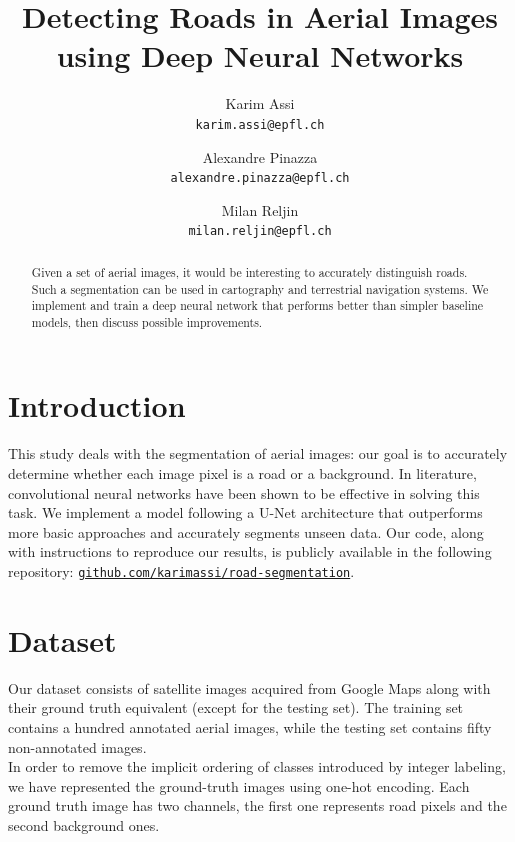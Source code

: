 \documentclass[10pt,conference,compsocconf]{IEEEtran}
\begin{document}
\title{Detecting Roads in Aerial Images using Deep Neural Networks}
\author{
  Karim Assi\\
  \texttt{karim.assi@epfl.ch}
  \and
  Alexandre Pinazza\\
  \texttt{alexandre.pinazza@epfl.ch}
  \and
  Milan Reljin\\
  \texttt{milan.reljin@epfl.ch}
}

\maketitle

\begin{abstract}
    Given a set of aerial images, it would be interesting to accurately distinguish roads. Such a segmentation can be used in cartography and terrestrial navigation systems. We implement and train a deep neural network that performs better than simpler baseline models, then discuss possible improvements. 
\end{abstract}

\section{Introduction}

This study deals with the segmentation of aerial images: our goal is to accurately determine whether each image pixel is a road or a background. In literature, convolutional neural networks have been shown to be effective in solving this task. We implement a model following a U-Net architecture that outperforms more basic approaches and accurately segments unseen data. Our code, along with instructions to reproduce our results, is publicly available in the following repository:
\href{https://github.com/karimassi/road-segmentation}{\texttt{github.com/karimassi/road-segmentation}}.

\section{Dataset}

Our dataset consists of satellite images acquired from Google Maps along with their ground truth equivalent (except for the testing set). The training set contains a hundred annotated aerial images, while the testing set contains fifty non-annotated images. \\

In order to remove the implicit ordering of classes introduced by integer labeling, we have represented the ground-truth images using one-hot encoding. Each ground truth image has two channels, the first one represents road pixels and the second background ones.
\end{document}
